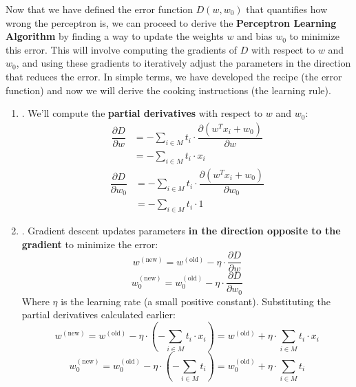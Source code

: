 Now that we have defined the error function $D\left(w, w_0\right)$ that quantifies how wrong the perceptron is, we can proceed to derive the \textbf{Perceptron Learning Algorithm} by finding a way to update the weights $w$ and bias $w_0$ to minimize this error. This will involve computing the gradients of $D$ with respect to $w$ and $w_0$, and using these gradients to iteratively adjust the parameters in the direction that reduces the error. In simple terms, we have developed the recipe (the error function) and now we will derive the cooking instructions (the learning rule).
\begin{enumerate}
    \item {}. We'll compute the \textbf{partial derivatives} with respect to $w$ and $w_0$:
    \begin{align*}
        \dfrac{\partial D}{\partial w}  &= - \sum_{i \in M} t_i \cdot \dfrac{\partial \left(w^T x_i + w_0\right)}{\partial w} \\[.3em]
                                        &= - \sum_{i \in M} t_i \cdot x_i
    \end{align*}
    \begin{align*}
        \dfrac{\partial D}{\partial w_0}&= - \sum_{i \in M} t_i \cdot \dfrac{\partial \left(w^T x_i + w_0\right)}{\partial w_0} \\[.3em]
                                        &= - \sum_{i \in M} t_i \cdot 1
    \end{align*}


    \item {}. Gradient descent updates parameters \textbf{in the direction opposite to the gradient} to minimize the error:
    \begin{equation*}
        w^{\left(\text{new}\right)} = w^{\left(\text{old}\right)} - \eta \cdot \dfrac{\partial D}{\partial w}
    \end{equation*}
    \begin{equation*}
        w_0^{\left(\text{new}\right)} = w_0^{\left(\text{old}\right)} - \eta \cdot \dfrac{\partial D}{\partial w_0}
    \end{equation*}
    Where $\eta$ is the learning rate (a small positive constant). Substituting the partial derivatives calculated earlier:
    \begin{equation*}
        w^{\left(\text{new}\right)} = w^{\left(\text{old}\right)} - \eta \cdot \left(- \sum_{i \in M} t_i \cdot x_i\right) = w^{\left(\text{old}\right)} + \eta \cdot \sum_{i \in M} t_i \cdot x_i
    \end{equation*}
    \begin{equation*}
        w_0^{\left(\text{new}\right)} = w_0^{\left(\text{old}\right)} - \eta \cdot \left(- \sum_{i \in M} t_i\right) = w_0^{\left(\text{old}\right)} + \eta \cdot \sum_{i \in M} t_i
    \end{equation*}
    


\end{enumerate}
